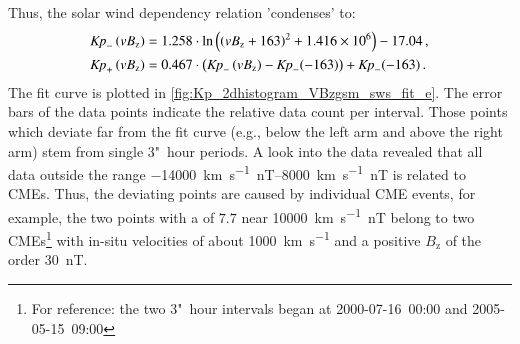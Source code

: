 Thus, the solar wind dependency relation 'condenses' to:
\begin{align}
	\text{\textit{Kp}}_-\left(vB_\text{z}\right) &= 1.258 \cdot \ln\left(\left(vB_\text{z} + 163\right)^2 + \num{1.416e6}\right) - 17.04	\,,	\label{eq:kpvsvbz_dependency_function_negative}\\
	\text{\textit{Kp}}_+\left(vB_\text{z}\right) &= 0.467 \cdot \left(\text{\textit{Kp}}_-\left(vB_\text{z}\right) - \text{\textit{Kp}}_-(-163)\right) + \text{\textit{Kp}}_-(-163)	\,.	\label{eq:kpvsvbz_dependency_function_positive}
\end{align}
The fit curve is plotted in \autoref{fig:Kp_2dhistogram_VBzgsm_sws_fit_e}. The error bars of the data points indicate the relative data count per \vBz{} interval. Those points which deviate far from the fit curve (e.g., below the left arm and above the right arm) stem from single 3"~hour periods. A look into the data revealed that all data outside the range \SIrange{-14000}{8000}{\km\per\s\nano\tesla} is related to CMEs. Thus, the deviating points are caused by individual CME events, for example, the two points with a \Kp{} of $7.7$ near \SI{10000}{\km\per\s\nano\tesla} belong to two CMEs\footnote{For reference: the two 3"~hour intervals began at 2000-07-16~00:00 and 2005-05-15~09:00} with in-situ velocities of about \SI{1000}{\km\per\s} and a positive $B_\text{z}$ of the order \SI{30}{\nano\tesla}.
\begin{figure}[htb]
\end{figure}

